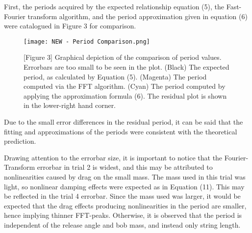 \documentclass[11pt]{article}
\begin{document}
\begin{multicols}{2}
    \begin{table}[H]
        \centering
        \caption*{[Table 1] Controlled variables regarding each trial. This table includes initial release angles, string lengths, and masses with uncertainties.}
    \end{table}

    First, the periods acquired by the expected relationship equation (5), the Fast-Fourier transform algorithm, and the period approximation given in equation (6) were catalogued in Figure 3 for comparison.

    \begin{figure}[H]
        \flushleft
        \texttt{[image: NEW - Period Comparison.png]}
        \caption*{[Figure 3] Graphical depiction of the comparison of period values. Errorbars are too small to be seen in the plot. (Black) The expected period, as calculated by Equation (5). (Magenta) The period computed via the FFT algorithm. (Cyan) The period computed by applying the approximation formula (6). The residual plot is shown in the lower-right hand corner.}
    \end{figure}
    
    Due to the small error differences in the residual period, it can be said that the fitting and approximations of the periods were consistent with the theoretical prediction. 

    Drawing attention to the errorbar size, it is important to notice that the Fourier-Transform errorbar in trial 2 is widest, and this may be attributed to nonlinearities caused by drag on the small mass. The mass used in this trial was light, so nonlinear damping effects were expected as in Equation (11). This may be reflected in the trial 4 errorbar. Since the mass used was larger, it would be expected that the drag effects producing nonlinearities in the period are smaller, hence implying thinner FFT-peaks. Otherwise, it is observed that the period is independent of the release angle and bob mass, and instead only string length. 


\end{multicols}
\end{document}
